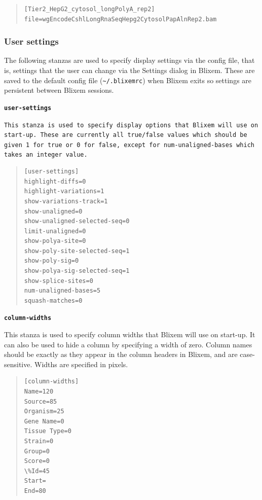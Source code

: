 \documentclass[letterpaper]{article}
\newcommand\textstyleSourceText[1]{\texttt{#1}}
\begin{document}
\bigskip

\begin{quote}
\begin{verbatim}
[Tier2_HepG2_cytosol_longPolyA_rep2]
file=wgEncodeCshlLongRnaSeqHepg2CytosolPapAlnRep2.bam
\end{verbatim}
\end{quote}

{\color[rgb]{0.30980393,0.5058824,0.7411765}\subsubsection[User settings ]{User settings }}
\hypertarget{RefHeading37791724351149}{}{
The following stanzas are used to specify display settings via the
config file, that is, settings that the user can change via the
Settings dialog in Blixem. These are saved to the default config file
(\textstyleSourceText{\~{}/.blixemrc}) when Blixem exits so settings
are persistent between Blixem sessions. }

\bigskip

{\textstyleSourceText{\textrm{\textbf{user-settings}}}\textbf{ }}

{\textstyleSourceText{\textrm{This stanza is used to specify display
options that Blixem will use on start-up. These are currently all
true/false values which should be given 1 for true or 0 for false,
except for num-unaligned-bases which takes an integer value.}} }

\bigskip

\begin{quote}
\begin{verbatim}
[user-settings]
highlight-diffs=0
highlight-variations=1
show-variations-track=1
show-unaligned=0
show-unaligned-selected-seq=0
limit-unaligned=0
show-polya-site=0
show-poly-site-selected-seq=1
show-poly-sig=0
show-polya-sig-selected-seq=1
show-splice-sites=0
num-unaligned-bases=5
squash-matches=0
\end{verbatim}
\end{quote}

{\textstyleSourceText{\textrm{\textbf{column-widths }}}}

This stanza is used to specify column widths that Blixem will use on start-up. It can also be used to hide a column by specifying a width of zero. Column names should be exactly as they appear in the column headers in Blixem, and are case-sensitive. Widths are specified in pixels. 

\begin{quote}
\begin{verbatim}
[column-widths]
Name=120
Source=85
Organism=25
Gene Name=0
Tissue Type=0
Strain=0
Group=0
Score=0
\%Id=45
Start=
End=80
\end{verbatim}
\end{quote}
\end{document}
